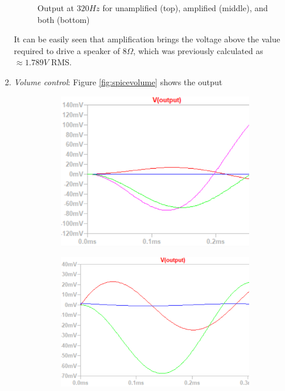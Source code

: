 \documentclass[notitlepage, 12pt]{report}
\begin{document}
\begin{enumerate}
\begin{figure}
        \caption{Output at $320 Hz$ for unamplified (top), amplified (middle), and both (bottom)}
        \label{fig:spicesimpower}
    \end{figure}
    It can be easily seen that amplification brings the voltage above the value 
    required to drive a speaker of $8 \Omega$, which was previously calculated as 
    $\approx 1.789 V$ RMS. 
    \item \emph{Volume control}: Figure \ref{fig:spicevolume} shows the output 
    \begin{figure}    
        \begin{subfigure}{0.3\textwidth}
            \includegraphics[scale=0.5]{images/volume011.png}
        \end{subfigure}
            \begin{subfigure}{0.3\textwidth}
            \includegraphics[scale=0.5]{images/volume101.png}

\end{subfigure}
\end{figure}
\end{enumerate}
\end{document}
